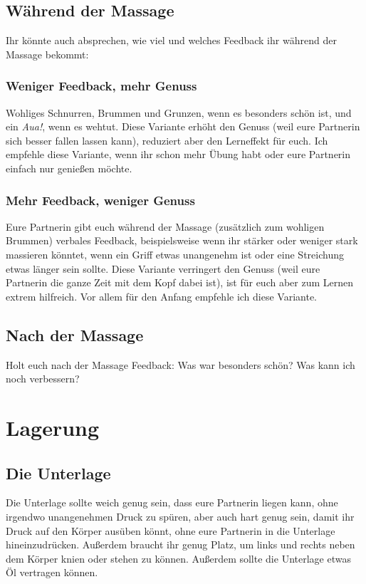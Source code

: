 \subsection{Während der Massage}

Ihr könnte auch absprechen, wie viel und welches Feedback ihr während der Massage bekommt:

\subsubsection{Weniger Feedback, mehr Genuss}
Wohliges Schnurren, Brummen und Grunzen, wenn es besonders schön ist, und ein \emph{Aua!}, wenn es wehtut. Diese Variante erhöht den Genuss (weil eure Partnerin sich besser fallen lassen kann), reduziert aber den Lerneffekt für euch. Ich empfehle diese Variante, wenn ihr schon mehr Übung habt oder eure Partnerin einfach nur genießen möchte.

\subsubsection{Mehr Feedback, weniger Genuss}
Eure Partnerin gibt euch während der Massage (zusätzlich zum wohligen Brummen) verbales Feedback, beispielsweise wenn ihr stärker oder weniger stark massieren könntet, wenn ein Griff etwas unangenehm ist oder eine Streichung etwas länger sein sollte. Diese Variante verringert den Genuss (weil eure Partnerin die ganze Zeit mit dem Kopf dabei ist), ist für euch aber zum Lernen extrem hilfreich. Vor allem für den Anfang empfehle ich diese Variante.

\subsection{Nach der Massage}

Holt euch nach der Massage Feedback: Was war besonders schön? Was kann ich noch verbessern?


\section{Lagerung}

\subsection{Die Unterlage}

Die Unterlage sollte weich genug sein, dass eure Partnerin liegen kann, ohne irgendwo unangenehmen Druck zu spüren, aber auch hart genug sein, damit ihr Druck auf den Körper ausüben könnt, ohne eure Partnerin in die Unterlage hineinzudrücken. Außerdem braucht ihr genug Platz, um links und rechts neben dem Körper knien oder stehen zu können. Außerdem sollte die Unterlage etwas Öl vertragen können.

